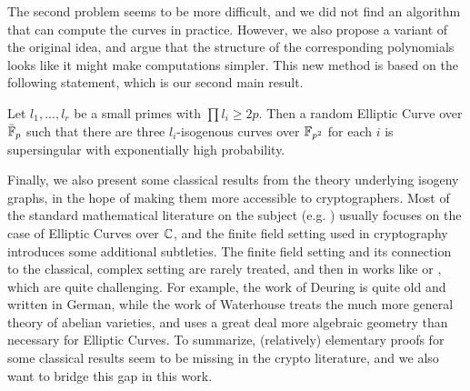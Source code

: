 The second problem seems to be more difficult, and we did not find an algorithm that can compute the curves in practice.
However, we also propose a variant of the original idea, and argue that the structure of the corresponding polynomials looks like it might make computations simpler.
This new method is based on the following statement, which is our second main result.
\begin{prop}
    \label{prop:main_result2}
    Let $l_1, ..., l_r$ be a small primes with $\prod l_i \geq 2p$.
    Then a random Elliptic Curve over $\bar{\mathbb{F}}_p$ such that there are three $l_i$-isogenous curves over $\mathbb{F}_{p^2}$ for each $i$ is supersingular with exponentially high probability.
\end{prop}
Finally, we also present some classical results from the theory underlying isogeny graphs, in the hope of making them more accessible to cryptographers.
Most of the standard mathematical literature on the subject (e.g. \cite{cox_primes_of_form}) usually focuses on the case of Elliptic Curves over $\mathbb{C}$, and the finite field setting used in cryptography introduces some additional subtleties.
The finite field setting and its connection to the classical, complex setting are rarely treated, and then in works like \cite{deuring_endomorphism_rings} or \cite{class_group_action_waterhouse}, which are quite challenging.
For example, the work of Deuring \cite{deuring_endomorphism_rings} is quite old and written in German, while the work of Waterhouse \cite{class_group_action_waterhouse} treats the much more general theory of abelian varieties, and uses a great deal more algebraic geometry than necessary for Elliptic Curves. 
To summarize, (relatively) elementary proofs for some classical results seem to be missing in the crypto literature, and we also want to bridge this gap in this work.
